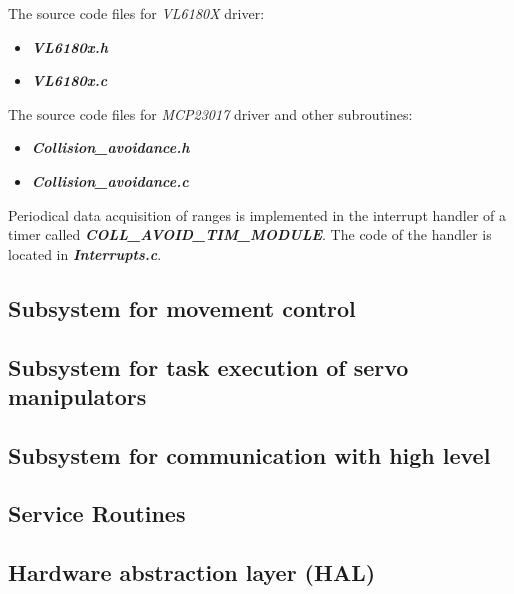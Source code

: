 \documentclass[a4paper,12pt]{article} %
\begin{document}
The source code files for  \textit{VL6180X} driver:
\begin{itemize}
	\item \textbf{\textit{VL6180x.h}}
	\item \textbf{\textit{VL6180x.c}}
\end{itemize}

The source code files for  \textit{MCP23017} driver and other subroutines:
\begin{itemize}
	\item \textbf{\textit{Collision\_avoidance.h}}
	\item \textbf{\textit{Collision\_avoidance.c}}
\end{itemize}

Periodical data acquisition of ranges is implemented in the interrupt handler of a timer called \textbf{\textit{COLL\_AVOID\_TIM\_MODULE}}. The code of the handler is located in \textbf{\textit{Interrupts.c}}.

\subsection{Subsystem for movement control}

\subsection{Subsystem for task execution of servo manipulators}

\subsection{Subsystem for communication with high level}

\subsection{Service Routines}

\subsection{Hardware abstraction layer (HAL)}


\end{document}
